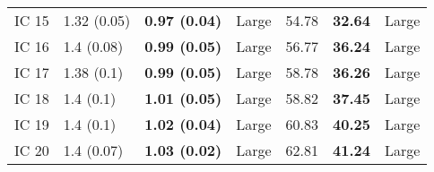 \begin{tabular}{lllllll}
 IC 15 &       1.32 (0.05) &  \textbf{0.97 (0.04)} &       Large &                   54.78 &           \textbf{32.64} &       Large \\
 IC 16 &        1.4 (0.08) &  \textbf{0.99 (0.05)} &       Large &                   56.77 &           \textbf{36.24} &       Large \\
 IC 17 &        1.38 (0.1) &  \textbf{0.99 (0.05)} &       Large &                   58.78 &           \textbf{36.26} &       Large \\
 IC 18 &         1.4 (0.1) &  \textbf{1.01 (0.05)} &       Large &                   58.82 &           \textbf{37.45} &       Large \\
 IC 19 &         1.4 (0.1) &  \textbf{1.02 (0.04)} &       Large &                   60.83 &           \textbf{40.25} &       Large \\
 IC 20 &        1.4 (0.07) &  \textbf{1.03 (0.02)} &       Large &                   62.81 &           \textbf{41.24} &       Large \\
\bottomrule
\end{tabular}
